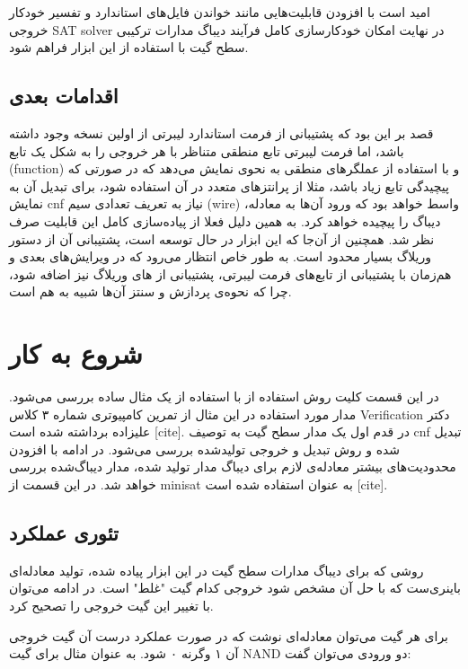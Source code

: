 \documentclass{article}
\begin{document}
امید است با افزودن قابلیت‌هایی مانند خواندن فایل‌های استاندارد  و تفسیر خودکار خروجی SAT solver در نهایت امکان خودکارسازی کامل فرآیند دیباگ مدارات ترکیبی سطح گیت با استفاده از این ابزار فراهم شود. 

\subsection{اقدامات بعدی}
قصد بر این بود که پشتیبانی از فرمت استاندارد لیبرتی  از اولین نسخه وجود  داشته باشد، اما فرمت لیبرتی تابع منطقی متناظر با 
هر خروجی را به شکل یک تابع (function) و با استفاده از عملگرهای منطقی به نحوی نمایش می‌دهد که در صورتی که پیچیدگی تابع زیاد باشد، مثلا از پرانتزهای 
متعدد در آن استفاده شود، برای تبدیل آن به نمایش cnf نیاز به تعریف تعدادی سیم (wire) واسط خواهد بود که ورود آن‌ها به معادله، دیباگ را پیچیده خواهد کرد. 
به همین دلیل فعلا از پیاده‌سازی کامل این قابلیت صرف نظر شد. همچنین از آن‌جا که این ابزار در حال توسعه است، پشتیبانی آن از دستور وریلاگ بسیار محدود 
است. به طور خاص انتظار می‌رود که در ویرایش‌های بعدی و هم‌زمان با پشتیبانی از تابع‌های فرمت لیبرتی، پشتیبانی از های وریلاگ نیز 
اضافه شود، چرا که نحوه‌ی پردازش و سنتز آن‌ها شبیه به هم است. 

\section{شروع به کار}
در این قسمت کلیت روش استفاده از  با استفاده از یک مثال ساده بررسی می‌شود. مدار مورد استفاده در این مثال از تمرین کامپیوتری شماره ۳ کلاس Verification دکتر علیزاده برداشته شده است [cite]. در قدم اول یک مدار سطح گیت به توصیف cnf تبدیل شده و روش تبدیل و خروجی تولیدشده بررسی می‌شود. در ادامه با افزودن محدودیت‌های بیشتر معادله‌ی لازم برای دیباگ مدار تولید شده، مدار دیباگ‌شده بررسی خواهد شد. در این قسمت از minisat به عنوان  استفاده شده است [cite]. 

\subsection{تئوری عملکرد}

روشی که برای دیباگ مدارات سطح گیت در این ابزار پیاده شده، تولید معادله‌ای باینری‌ست که با حل آن مشخص شود خروجی کدام گیت "غلط" است. در ادامه می‌توان با تغییر این گیت خروجی را تصحیح کرد. 

برای هر گیت می‌توان معادله‌ای نوشت که در صورت عملکرد درست آن گیت خروجی آن ۱ وگرنه ۰ شود. به عنوان مثال برای گیت NAND دو ورودی می‌توان گفت: 
\begin{flushleft}


\end{flushleft}
\end{document}
